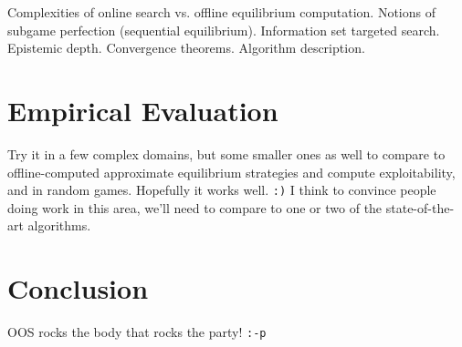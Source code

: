 \documentclass[letterpaper]{article}
\begin{document}
Complexities of online search vs. offline equilibrium computation. Notions of subgame perfection (sequential equilibrium). Information set targeted search. Epistemic depth.
Convergence theorems. Algorithm description.

\section{Empirical Evaluation}

Try it in a few complex domains, but some smaller ones as well to compare to offline-computed approximate equilibrium strategies and compute exploitability, and in random games. 
Hopefully it works well. {\tt :)} I think to convince people doing work in this area, we'll need 
to compare to one or two of the state-of-the-art algorithms. 

\section{Conclusion}

OOS rocks the body that rocks the party! {\tt :-p}  




\end{document}
